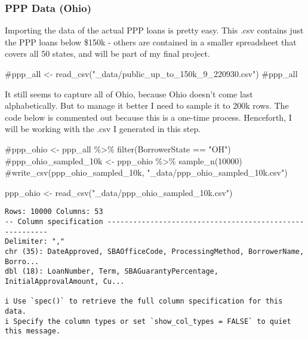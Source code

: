 \documentclass[
  letterpaper,
  DIV=11,
  numbers=noendperiod]{scrartcl}
\newenvironment{Shaded}{\begin{snugshade}}{\end{snugshade}}
\newcommand{\CommentTok}[1]{\textcolor[rgb]{0.37,0.37,0.37}{#1}}
\newcommand{\FunctionTok}[1]{\textcolor[rgb]{0.28,0.35,0.67}{#1}}
\newcommand{\NormalTok}[1]{\textcolor[rgb]{0.00,0.23,0.31}{#1}}
\newcommand{\OtherTok}[1]{\textcolor[rgb]{0.00,0.23,0.31}{#1}}
\newcommand{\StringTok}[1]{\textcolor[rgb]{0.13,0.47,0.30}{#1}}
\begin{document}
\hypertarget{ppp-data-ohio}{%
\subsubsection{PPP Data (Ohio)}\label{ppp-data-ohio}}

Importing the data of the actual PPP loans is pretty easy. This .csv
contains just the PPP loans below \$150k - others are contained in a
smaller spreadsheet that covers all 50 states, and will be part of my
final project.

\begin{Shaded}
\begin{Highlighting}[]
\CommentTok{\#ppp\_all \textless{}{-} read\_csv("\_data/public\_up\_to\_150k\_9\_220930.csv")}
\CommentTok{\#ppp\_all}
\end{Highlighting}
\end{Shaded}

It still seems to capture all of Ohio, because Ohio doesn't come last
alphabetically. But to manage it better I need to sample it to 200k
rows. The code below is commented out because this is a one-time
process. Henceforth, I will be working with the .csv I generated in this
step.

\begin{Shaded}
\begin{Highlighting}[]
\CommentTok{\#ppp\_ohio \textless{}{-} ppp\_all \%\textgreater{}\% filter(BorrowerState == "OH")}
\CommentTok{\#ppp\_ohio\_sampled\_10k \textless{}{-} ppp\_ohio \%\textgreater{}\% sample\_n(10000)}
\CommentTok{\#write\_csv(ppp\_ohio\_sampled\_10k, "\_data/ppp\_ohio\_sampled\_10k.csv")}

\NormalTok{ppp\_ohio }\OtherTok{\textless{}{-}} \FunctionTok{read\_csv}\NormalTok{(}\StringTok{"\_data/ppp\_ohio\_sampled\_10k.csv"}\NormalTok{)}
\end{Highlighting}
\end{Shaded}

\begin{verbatim}
Rows: 10000 Columns: 53
-- Column specification --------------------------------------------------------
Delimiter: ","
chr (35): DateApproved, SBAOfficeCode, ProcessingMethod, BorrowerName, Borro...
dbl (18): LoanNumber, Term, SBAGuarantyPercentage, InitialApprovalAmount, Cu...

i Use `spec()` to retrieve the full column specification for this data.
i Specify the column types or set `show_col_types = FALSE` to quiet this message.
\end{verbatim}
\end{document}
